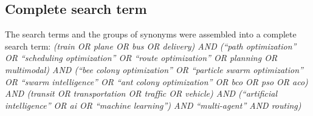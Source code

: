 
\subsection{Complete search term}
\label{searchterm}
The search terms and the groups of synonyms were assembled into a complete search term:
\newline
\textit{(train OR plane OR bus OR delivery) AND (``path optimization'' OR ``scheduling optimization'' OR ``route optimization'' OR planning OR multimodal) AND (``bee colony optimization'' OR ``particle swarm optimization'' OR ``swarm intelligence'' OR ``ant colony optimization'' OR bco OR pso OR aco) AND (transit OR transportation OR traffic OR vehicle) AND (``artificial intelligence'' OR ai OR ``machine learning'') AND ``multi-agent'' AND routing)}

